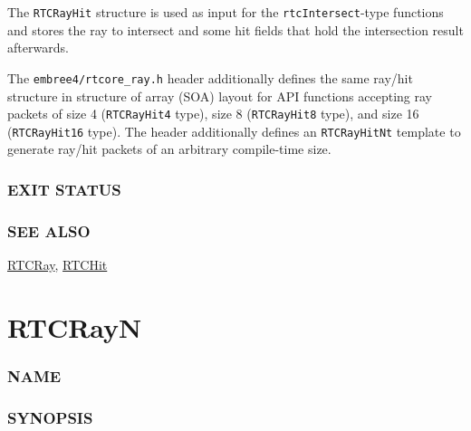 The \texttt{RTCRayHit} structure is used as input for the
\texttt{rtcIntersect}-type functions and stores the ray to intersect and
some hit fields that hold the intersection result afterwards.

The \texttt{embree4/rtcore\_ray.h} header additionally defines the same
ray/hit structure in structure of array (SOA) layout for API functions
accepting ray packets of size 4 (\texttt{RTCRayHit4} type), size 8
(\texttt{RTCRayHit8} type), and size 16 (\texttt{RTCRayHit16} type). The
header additionally defines an \texttt{RTCRayHitNt} template to generate
ray/hit packets of an arbitrary compile-time size.

\subsubsection{EXIT STATUS}\label{exit-status}

\subsubsection{SEE ALSO}\label{see-also}

\hyperref[rtcray]{RTCRay}, \hyperref[rtchit]{RTCHit}

\pagebreak

\section{RTCRayN}\label{rtcrayn}

\subsubsection{NAME}\label{name}

\begin{Shaded}
\begin{Highlighting}[]
\OperatorTok{{-}}
\end{Highlighting}
\end{Shaded}

\subsubsection{SYNOPSIS}\label{synopsis}

